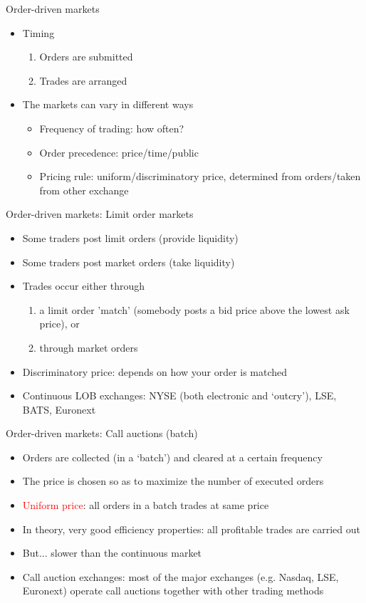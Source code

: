 \begin{frame}{Order-driven markets}
\begin{itemize}
	\item Timing
	\begin{enumerate}
		\item Orders are submitted
		\item Trades are arranged
	\end{enumerate}
	\item The markets can vary in different ways
	\begin{itemize}
		\item Frequency of trading: how often?
		\item Order precedence: price/time/public
		\item Pricing rule: uniform/discriminatory price, determined from orders/taken from other exchange
	\end{itemize}
\end{itemize}
\end{frame}


\begin{frame}{Order-driven markets: Limit order markets}
\begin{itemize}
	\item Some traders post limit orders (provide liquidity)
	\item Some traders post market orders (take liquidity)
	\item Trades occur either through 
	\begin{enumerate}
		\item a limit order 'match' (somebody posts a bid price above the lowest ask price), or
		\item through market orders
	\end{enumerate}
	\item \alert{Discriminatory price}: depends on how your order is matched
	\item Continuous LOB exchanges: NYSE (both electronic and `outcry'), LSE, BATS, Euronext
\end{itemize}
\end{frame}


\begin{frame}{Order-driven markets: Call auctions (batch)}
\begin{itemize}
	\item Orders are collected (in a `batch') and cleared at a certain frequency
	\item The price is chosen so as to maximize the number of executed orders
	\item \textcolor{red}{Uniform price}: all orders in a batch trades at same price
	\item In theory,  very good efficiency properties: all profitable trades are carried out
	\item But... slower than the continuous market
	\item Call auction exchanges: most of the major exchanges (e.g. Nasdaq, LSE, Euronext) operate call auctions together with other trading methods
\end{itemize}
\end{frame}


